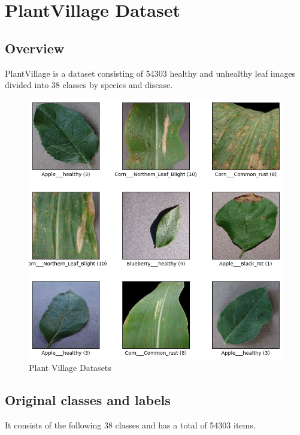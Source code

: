 \section{PlantVillage Dataset}

    \subsection{Overview}
    PlantVillage is a dataset consisting of 54303 healthy and unhealthy leaf images divided into 38 classes by species and disease.
    \begin{figure}
        \centering
        \includegraphics[width=\linewidth]{graphics//chapter 4/plant village dataset viz.png}
        \caption{Plant Village Datasets}
        \label{fig:plant village vizl}
    \end{figure}
    
    \subsection{Original classes and labels}
        It consists of the following 38 classes and has a total of 54303 items.

